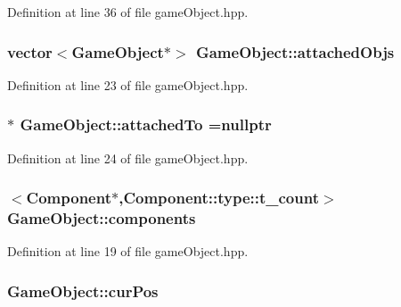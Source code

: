 Definition at line 36 of file game\-Object.\-hpp.

\hypertarget{class_game_object_aa530b362b47955806ed3301719d86bdd}{
\subsubsection[{attached\-Objs}]{\setlength{\rightskip}{0pt plus 5cm}vector$<${\bf Game\-Object}$\ast$$>$ Game\-Object\-::attached\-Objs}}\label{class_game_object_aa530b362b47955806ed3301719d86bdd}


Definition at line 23 of file game\-Object.\-hpp.

\hypertarget{class_game_object_ae7c5ba7343f3fe8639a4291c71947eaa}{
\subsubsection[{attached\-To}]{$\ast$ Game\-Object\-::attached\-To =nullptr}}\label{class_game_object_ae7c5ba7343f3fe8639a4291c71947eaa}


Definition at line 24 of file game\-Object.\-hpp.

\hypertarget{class_game_object_acd9609420f9ee5681c594e9ac56aa435}{
\subsubsection[{components}]{$<${\bf Component}$\ast$,Component\-::type\-::t\-\_\-count$>$ Game\-Object\-::components}}\label{class_game_object_acd9609420f9ee5681c594e9ac56aa435}


Definition at line 19 of file game\-Object.\-hpp.

\hypertarget{class_game_object_af1e7cdfc116c9219435d8222512af956}{
\subsubsection[{cur\-Pos}]{ Game\-Object\-::cur\-Pos}}\label{class_game_object_af1e7cdfc116c9219435d8222512af956}


